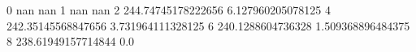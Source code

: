 0 nan nan
1 nan nan
2 244.74745178222656 6.127960205078125
4 242.35145568847656 3.731964111328125
6 240.1288604736328 1.509368896484375
8 238.61949157714844 0.0
